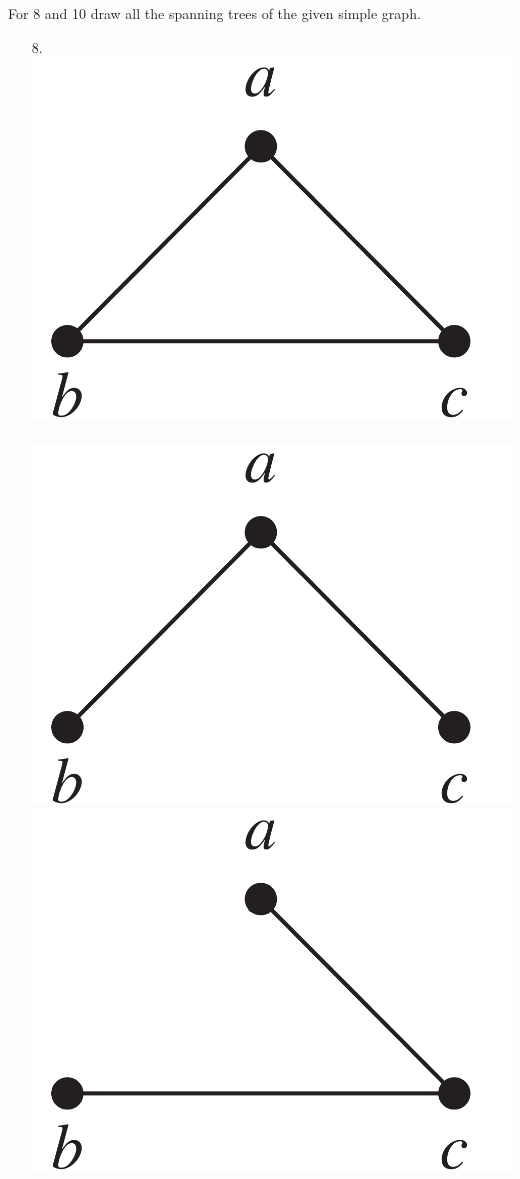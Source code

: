 For 8 and 10 draw all the spanning trees of the given
simple graph.
\begin{itemize}
\item[8.]  \text{}\\
\includegraphics[scale = 0.2]{img/11_4_8_graph.png} \vspace{2mm} \\
\answer \\
\includegraphics[scale = 0.2]{img/11_4_8_tree1.png} 
\includegraphics[scale = 0.2]{img/11_4_8_tree2.png} 

\end{itemize}
